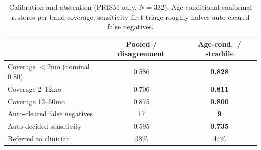 \begin{table}[!t]\caption{Calibration and abstention (PRISM only, $N{=}332$). Age-conditional conformal
restores per-band coverage; sensitivity-first triage roughly halves auto-cleared false negatives.}\label{tab:calib}
\centering\small
\begin{tabular}{@{}lcc@{}}\toprule
 & Pooled / disagreement & \textbf{Age-cond.\ / straddle}\\\midrule
Coverage $<$2mo (nominal 0.80) & 0.586 & \textbf{0.828}\\
Coverage 2--12mo & 0.706 & \textbf{0.811}\\
Coverage 12--60mo & 0.875 & \textbf{0.800}\\\midrule
Auto-cleared false negatives & 17 & \textbf{9}\\
Auto-decided sensitivity & 0.595 & \textbf{0.735}\\
Referred to clinician & 38\% & 44\%\\\bottomrule
\end{tabular}\end{table}
